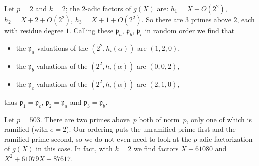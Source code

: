 \documentclass{article}
\def\p{{\mathfrak p}}
\begin{document}
Let $p=2$ and $k=2$; the $2$-adic factors of $g(X)$ are: $h_1=X+O(2^2)$,
$h_2=X+2+O(2^2)$, $h_3=X+1+O(2^2)$.  So there are $3$
primes above $2$, each with residue degree $1$.
Calling these $\p_a$, $\p_b$, $\p_c$ in random order we find that
\begin{itemize}
  \item the $\p_a$-valuations of the $(2^2,h_i(\alpha))$ are $(1,2,0)$,
  \item the $\p_b$-valuations of the $(2^2,h_i(\alpha))$ are $(0,0,2)$,
  \item the $\p_c$-valuations of the $(2^2,h_i(\alpha))$ are $(2,1,0)$,
\end{itemize}
thus $\p_1=\p_c$, $\p_2=\p_a$ and $\p_3=\p_b$.

Let $p=503$.  There are two primes above~$p$ both of norm~$p$, only
one of which is ramified (with $e=2$). Our ordering puts the
unramified prime first and the ramified prime second, so we do not even need to
look at the $p$-adic factorization of $g(X)$ in this case.  In fact,
with $k=2$ we find factors $X-61080$ and $X^2+61079X+87617$.
\end{document}
